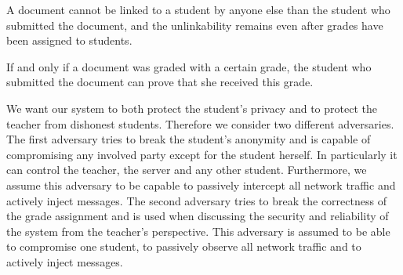 \begin{propertydef}
A document cannot be linked to a student by anyone else than the
student who submitted the document, and the unlinkability remains
even after grades have been assigned to students.
\end{propertydef}
\vspace{-1em}
\begin{propertydef}
If and only if a document was graded with a certain grade, the
student who submitted the document can prove that she received
this grade.
\end{propertydef}

We want our system to both protect the student's privacy and to protect
the teacher from dishonest students. Therefore we consider two different
adversaries. 
%
The first adversary tries to break the student's anonymity and is
capable of compromising any involved party except for the student
herself. In particularly it can control the teacher, the server and any
other student. Furthermore, we assume this adversary to be capable to
passively intercept all network traffic and actively inject messages. 
%
The second adversary tries to break the correctness of the grade
assignment and is used when discussing the security and reliability of
the system from the teacher's perspective. 
This adversary is assumed to be able to compromise one student, to
passively observe all network traffic and to actively inject messages.



